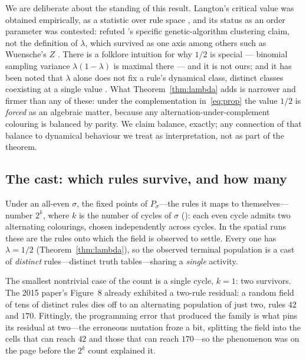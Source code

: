 \documentclass[man,12pt,floatsintext]{apa7}
\newcommand{\sig}{\sigma}
\newcommand{\secref}[1]{\emph{\nameref{#1}}}
\begin{document}
We are deliberate about the standing of this result. Langton's critical
value was obtained empirically, as a statistic over rule space
\parencite{langton1990computation}, and its status as an order parameter
was contested: \textcite{mitchell1993revisiting} refuted
\textcite{packard1988adaptation}'s specific genetic-algorithm clustering
claim, not the definition of $\lambda$, which survived as one axis among
others such as Wuensche's $Z$ \parencite{wuensche1999classifying}. There is
a folklore intuition for why $1/2$ is special --- binomial sampling variance
$\lambda(1-\lambda)$ is maximal there --- and it is not ours; and it has been
noted that $\lambda$ alone does not fix a rule's dynamical class, distinct
classes coexisting at a single value \parencite{sakai2002edge}. What
Theorem~\ref{thm:lambda} adds is narrower and firmer than any of these: under
the complementation in~\eqref{eq:prop} the value $1/2$ is \emph{forced} as an
algebraic matter, because any alternation-under-complement colouring is
balanced by parity. We claim balance, exactly; any connection of that
balance to dynamical behaviour we treat as interpretation, not as part of the
theorem.

\subsection{The cast: which rules survive, and how many}

Under an all-even $\sig$, the fixed points of $P_\sig$---the rules it maps to
themselves---number $2^k$, where $k$ is the number of cycles of $\sig$
(\secref{sec:classification}): each even cycle admits two alternating
colourings, chosen independently across cycles. In the spatial runs these are
the rules onto which the field is observed to settle. Every one has
$\lambda = 1/2$ (Theorem~\ref{thm:lambda}), so the observed terminal
population is a cast of \emph{distinct} rules---distinct truth tables---sharing
a \emph{single} activity.

The smallest nontrivial case of the count is a single cycle, $k = 1$: two
survivors. The 2015 paper's Figure~8 already exhibited a two-rule residual: a
random field of tens of distinct rules dies off to an alternating population of
just two, rules $42$ and $170$.
Fittingly, the programming error that produced the family is what pins its
residual at two---the erroneous mutation froze a bit, splitting the field
into the cells that can reach $42$ and those that can reach $170$---so the
phenomenon was on the page before the $2^k$ count explained it.
\end{document}
